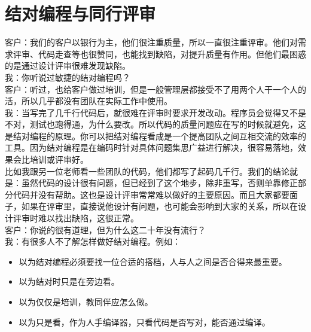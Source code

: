 \chapter{结对编程与同行评审} %

客户：我们的客户以银行为主，他们很注重质量，所以一直很注重评审。他们对需求评审、代码走查等也很赞同，也能找到缺陷，对提升质量有作用。但他们最困惑的是通过设计评审很难发现缺陷。\\
我：你听说过敏捷的结对编程吗？\\
客户：听过，也给客户做过培训，但是一般管理层都接受不了用两个人干一个人的活，所以几乎都没有团队在实际工作中使用。\\
我：当写完了几千行代码后，就很难在评审时要求开发改动。程序员会觉得又不是不对，测试也跑得通，为什么要改。所以代码的质量问题应在写的时候就避免，这是结对编程的原理。你可以把结对编程看成是一个提高团队之间互相交流的效率的工具。因为结对编程是在编码时针对具体问题集思广益进行解决，很容易落地，效果会比培训或评审好。\\
比如我跟另一位老师看一些团队的代码，他们都写了起码几千行。我们的结论就是：虽然代码的设计很有问题，但已经到了这个地步，除非重写，否则单靠修正部分代码并没有帮助。这也是设计评审常常难以做好的主要原因。而且大家都要面子，如果在评审里，直接说他设计有问题，也可能会影响到大家的关系，所以在设计评审时难以找出缺陷，这很正常。\\
客户：你说的很有道理，但为什么这二十年没有流行？\\
我：有很多人不了解怎样做好结对编程。例如：

\begin{itemize}
\tightlist
\item
  以为结对编程必须要找一位合适的搭档，人与人之间是否合得来最重要。
\item
  以为结对时只是在旁边看。
\item
  以为仅仅是培训，教同伴应怎么做。
\item
  以为只是看，作为人手编译器，只看代码是否写对，能否通过编译。
\end{itemize}

